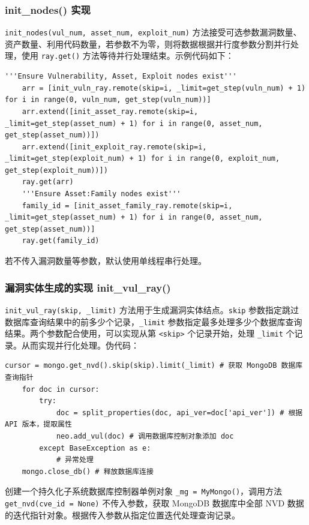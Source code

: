 \documentclass[a4paper,AutoFakeBold,oneside,12pt]{book}
\begin{document}
\subsubsection{init{\_}nodes() 实现}

\lstinline|init_nodes(vul_num, asset_num, exploit_num)| 方法接受可选参数漏洞数量、资产数量、利用代码数量，若参数不为零，则将数据根据并行度参数分割并行处理，使用 \lstinline|ray.get()| 方法等待并行处理结束。示例代码如下：
\begin{lstlisting}[style=lgeneral]
	'''Ensure Vulnerability, Asset, Exploit nodes exist'''
	arr = [init_vuln_ray.remote(skip=i, _limit=get_step(vuln_num) + 1) for i in range(0, vuln_num, get_step(vuln_num))]
	arr.extend([init_asset_ray.remote(skip=i, _limit=get_step(asset_num) + 1) for i in range(0, asset_num, get_step(asset_num))])
	arr.extend([init_exploit_ray.remote(skip=i, _limit=get_step(exploit_num) + 1) for i in range(0, exploit_num, get_step(exploit_num))])
	ray.get(arr)
	'''Ensure Asset:Family nodes exist'''
	family_id = [init_asset_family_ray.remote(skip=i, _limit=get_step(asset_num) + 1) for i in range(0, asset_num, get_step(asset_num))]
	ray.get(family_id)
\end{lstlisting}

若不传入漏洞数量等参数，默认使用单线程串行处理。

\subsubsection{漏洞实体生成的实现 init{\_}vul{\_}ray()\label{subsubsec:vul}}

\lstinline|init_vul_ray(skip, _limit)| 方法用于生成漏洞实体结点。\lstinline|skip| 参数指定跳过数据库查询结果中的前多少个记录，\lstinline|_limit| 参数指定最多处理多少个数据库查询结果。两个参数配合使用，可以实现从第 \lstinline|<skip>| 个记录开始，处理 \lstinline|_limit| 个记录。从而实现并行化处理。伪代码：
\begin{lstlisting}[style=lgeneral]
	cursor = mongo.get_nvd().skip(skip).limit(_limit) # 获取 MongoDB 数据库查询指针
	for doc in cursor:
		try:
			doc = split_properties(doc, api_ver=doc['api_ver']) # 根据 API 版本，提取属性
			neo.add_vul(doc) # 调用数据库控制对象添加 doc
		except BaseException as e:
			# 异常处理
	mongo.close_db() # 释放数据库连接
\end{lstlisting}

创建一个持久化子系统数据库控制器单例对象 \lstinline|_mg = MyMongo()|，调用方法 \lstinline|get_nvd(cve_id = None)| 不传入参数，获取 MongoDB 数据库中全部 NVD 数据的迭代指针对象。根据传入参数从指定位置迭代处理查询记录。
\end{document}
